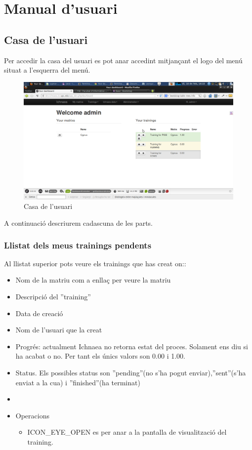 \chapter{Manual d'usuari}
\label{cha:userguide}

\section{Casa de l'usuari}
\label{sec:home}
Per accedir la casa del usuari es pot anar accedint mitjançant el logo del men\'{u} situat a l'esquerra del men\'{u}.

\begin{figure}[h!]
  \centering
  \includegraphics[scale=0.2]{img/userguide/dashboard_complete_trainings.png}
  \caption{Casa de l'usuari}
  \label{fig:placement}
\end{figure}
A continuaci\'{o} descriurem cadascuna de les parts.

\subsection{Llistat dels meus trainings pendents}
Al llistat superior pots veure els trainings que has creat on::
\begin{itemize}
\item Nom de la matriu com a enllaç per veure la matriu
\item Descripci\'{o} del ''training''
\item Data de creaci\'{o}
\item Nom de l'usuari que la creat
\item Progr\'{e}s: actualment Ichnaea no retorna estat del proces. Solament ens diu si ha acabat o no. Per tant els \'{u}nics valors son 0.00 i 1.00.
\item Status. Els possibles status son ''pending''(no s'ha pogut enviar),''sent''(s'ha enviat a la cua) i ''finished''(ha terminat)
\item 
\item Operacions
 \begin{itemize}
 \item ICON_EYE_OPEN es per anar a la pantalla de visualitzaci\'{o} del training.
 \end{itemize}
\end{itemize}

